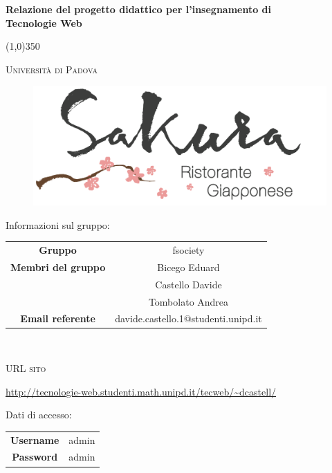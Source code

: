 \documentclass{article}
\author{Bicego Eduard, Castello Davide, Tombolato Andrea}
\date{01/02/2016}
\begin{document}
	\begin{titlepage}
		\centering
	{\huge\bfseries Relazione del progetto didattico per l'insegnamento di \\Tecnologie Web \par}

	\line(1,0){350} \\
	{\scshape\LARGE Università di Padova \par}
	\vspace{0.5cm}
	\hypersetup{
		colorlinks=true,
		linkcolor=blue,
		anchorcolor=black,
		citecolor=black,
		urlcolor=blue,
	}
	\begin{figure}[H]
	\centering
		\includegraphics[width=\textwidth]{images/logo}
	\end{figure}
	{\LARGE Informazioni sul gruppo:\par}
	\vspace{0.3cm}
	\begin{tabular}{c|c} 
		{\hfill\textbf{Gruppo}} 			&  fsociety  \\ 
		{\hfill\textbf{Membri del gruppo}} 			&  Bicego Eduard \\ 
										& Castello Davide \\
										& Tombolato Andrea \\
		{\hfill\textbf{Email referente}} 		& davide.castello.1@studenti.unipd.it \\
	\end{tabular}\\
	\vspace{1cm}
	{\scshape\LARGE URL sito \par}
	\vspace{0.2cm}
	\large \url{http://tecnologie-web.studenti.math.unipd.it/tecweb/~dcastell/} \par
	\vspace{0.5cm}
	{\LARGE Dati di accesso:\par}
	\vspace{0.3cm}
	\begin{tabular}{c|c} 
		{\hfill\textbf{Username}} 			&  admin  \\ 
		{\hfill\textbf{Password}} 		& admin  	\\
	\end{tabular}\\
	\end{titlepage}
\newpage
	\pagestyle{myfrontrel}
	\tableofcontents
\newpage
	\listoffigures
	\label{LastFrontPage}
\newpage
	\pagestyle{myrel}
	
\newpage
	
\newpage
	
\newpage
	
\newpage
	
\newpage
	
\label{LastPage}
\end{document}
